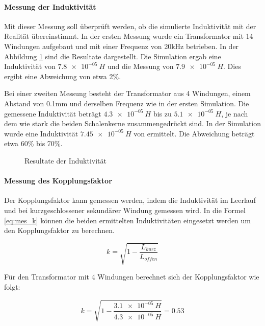 \paragraph{Messung der Induktivität}
Mit dieser Messung soll überprüft werden, ob die simulierte Induktivität mit der Realität übereinstimmt. In der ersten Messung wurde ein Transformator mit 14 Windungen aufgebaut und mit einer Frequenz von 20kHz betrieben. In der Abbildung \ref{fig:mess_ind} sind die Resultate dargestellt. Die Simulation ergab eine Induktivität von $ \SI{7.8e-05}{H} $ und die Messung von $ \SI{7.9e-05}{H} $. Dies ergibt eine Abweichung von etwa 2\%. 

Bei einer zweiten Messung besteht der Transformator aus 4 Windungen, einem Abstand von 0.1mm und derselben Frequenz wie in der ersten Simulation. Die gemessene Induktivität beträgt $ \SI{4.3e-05}{H} $ bis zu $ \SI{5.1e-05}{H} $, je nach dem wie stark die beiden Schalenkerne zusammengedrückt sind. In der Simulation wurde eine Induktivität $ \SI{7.45e-05}{H} $ von ermittelt. Die Abweichung beträgt etwa 60\% bis 70\%. 

\begin{figure}[H]
	\centering
	\qquad
	\caption{Resultate der Induktivität}
	\label{fig:mess_ind}
\end{figure}

\paragraph{Messung des Kopplungsfaktor}
Der Kopplungsfaktor kann gemessen werden, indem die Induktivität im Leerlauf und bei kurzgeschlossener sekundärer Windung gemessen wird. In die Formel \ref{eq:mes_k} können die beiden ermittelten Induktivitäten eingesetzt werden um den Kopplungsfaktor zu berechnen.

\begin{equation}\label{eq:mes_k}
k = \sqrt{1-\frac{L_{kurz}}{L_{offen}}}
\end{equation}

Für den Transformator mit 4 Windungen berechnet sich der Kopplungsfaktor wie folgt:

\begin{equation}\label{eq:berechnung_k1}
k = \sqrt{1-\frac{\SI{3.1e-05}{H}}{\SI{4.3e-05}{H}}}=0.53
\end{equation}

